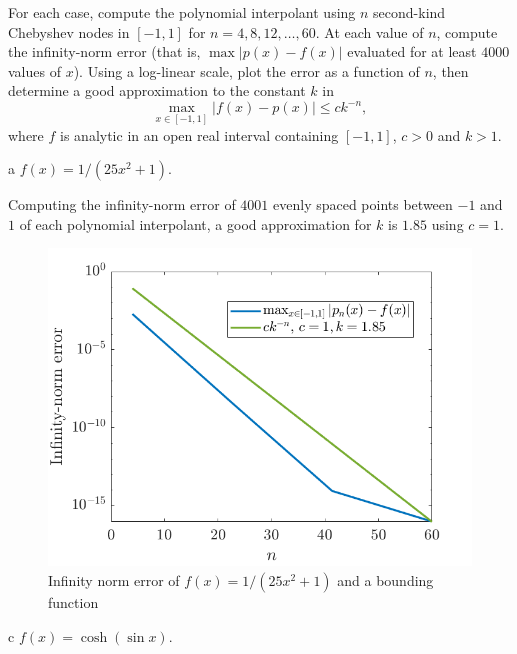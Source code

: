 \begin{statement}{5}
  For each case, compute the polynomial interpolant using $n$ second-kind
  Chebyshev nodes in $[-1, 1]$ for $n = 4, 8, 12, \dots, 60$.
  At each value of $n$, compute the infinity-norm error
  (that is, $\max|p(x) - f(x)|$ evaluated for at least $4000$ values of $x$).
  Using a log-linear scale, plot the error as a function of $n$,
  then determine a good approximation to the constant $k$ in
  \[
    \max_{x \in [-1, 1]} |f(x) - p(x)| \leq c k ^{-n},
  \]
  where $f$ is analytic in an open real interval containing $[-1, 1]$, $c > 0$ and $k > 1$.
\end{statement}

\begin{statement}{a}
  $f(x) = 1 / (25 x^2 + 1)$.
\end{statement}

\begin{solution}
  Computing the infinity-norm error of $4001$ evenly spaced points between $-1$ and $1$
  of each polynomial interpolant, a good approximation for $k$ is $1.85$ using $c = 1$.
  
  \begin{figure}[H]
    \centering
    \includegraphics[scale=0.5]{graphics/plot-05-01.png}
    \caption{Infinity norm error of $f(x) = 1 / (25 x^2 + 1)$ and a bounding function}
  \end{figure}
\end{solution}

\begin{statement}{c}
  $f(x) = \cosh(\sin x)$.
\end{statement}

